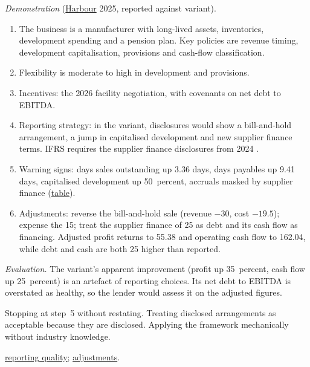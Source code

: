 \begin{qfmethod}
 \emph{Demonstration} (\hyperref[ex:harbour-tools-statements]{Harbour} 2025, reported against variant).
\begin{enumerate}
\item The business is a manufacturer with long-lived assets, inventories, development spending and a pension plan. Key policies are revenue timing, development capitalisation, provisions and cash-flow classification.
\item Flexibility is moderate to high in development and provisions.
\item Incentives: the 2026 facility negotiation, with covenants on net debt to EBITDA.
\item Reporting strategy: in the variant, disclosures would show a bill-and-hold arrangement, a jump in capitalised development and new supplier finance terms. IFRS requires the supplier finance disclosures from 2024 \citep[Annex, IAS~7 paras.~44F--44H]{eu-2024-1317-supplier-finance}.
\item Warning signs: days sales outstanding up 3.36 days, days payables up 9.41 days, capitalised development up 50~percent, accruals masked by supplier finance (\hyperref[meth:reporting-warning-signs]{table}).
\item Adjustments: reverse the bill-and-hold sale (revenue $-30$, cost $-19.5$); expense the 15; treat the supplier finance of 25 as debt and its cash flow as financing. Adjusted profit returns to 55.38 and operating cash flow to 162.04, while debt and cash are both 25 higher than reported.
\end{enumerate}
\emph{Evaluation.} The variant's apparent improvement (profit up 35~percent, cash flow up 25~percent) is an artefact of reporting choices. Its net debt to EBITDA is overstated as healthy, so the lender would assess it on the adjusted figures.

 Stopping at step~5 without restating. Treating disclosed arrangements as acceptable because they are disclosed. Applying the framework mechanically without industry knowledge.

 \hyperref[def:reporting-results-quality]{reporting quality}; \hyperref[meth:accounting-analysis-adjustments]{adjustments}.

\end{qfmethod}

